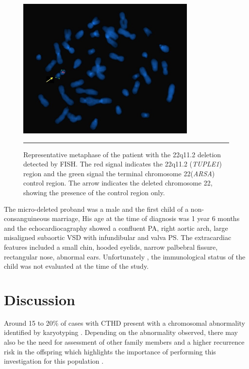 \begin{refsection}
\begin{figure}[!tb]
\centering
\includegraphics[width=\linewidth]{Figures/Figure3_4.pdf}
\rule{35em}{0.5pt}
\caption[Representative FISH image of patient with 22q11.2 deletion]{Representative metaphase of the patient with the 22q11.2 deletion detected by FISH.
The red signal indicates the 22q11.2 (\textit{TUPLE1}) region and the green signal the terminal chromosome 22(\textit{ARSA}) control region.
The arrow indicates the deleted chromosome 22, showing the presence of the control region only.}
\label{fig:FISH3.4}
\end{figure}

The micro-deleted proband was a male and the first child of a non- consanguineous marriage, His age at the time of diagnosis was 1 year 6 months and the echocardiocagraphy showed a confluent PA, right aortic arch, large misaligned subaortic VSD with infundibular and valva PS. The extracardiac features included a small chin, hooded eyelids, narrow palbebral fissure, rectangular nose, abnormal ears. Unfortunately , the immunological status of the child was not evaluated at the time of the study.



\section{Discussion} \label{18deldup}

Around 15 to 20\% of cases with CTHD present with a chromosomal abnormality identified by karyotyping \cite{robinson1994clinical, blue2012congenital}. Depending on the abnormality observed, there may also be the need for assessment of other family members and a higher recurrence risk in the offspring which highlights the importance of performing this investigation for this population \cite{hartman2011contribution, harris2003epidemiology, stoll1989risk, pradat1992epidemiology, hanna1994genetic, goodship1998population, grech1999syndromes, meberg2000outcome, roodpeyma2002risk, calzolari2003congenital, dadvand2009descriptive, hartman2011contribution, rosa2011trisomy}.


\end{refsection}
